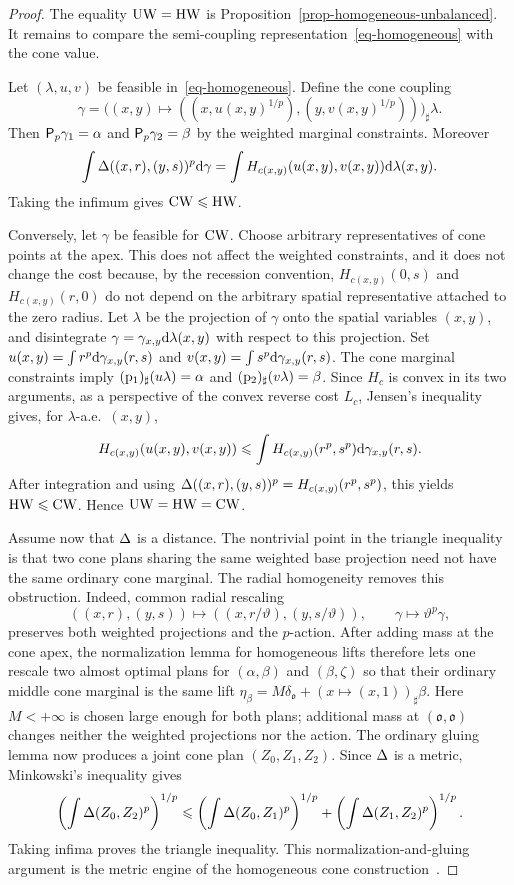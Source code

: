 \begin{proof}
	The equality $\operatorname{UW}=\operatorname{HW}$ is Proposition~\ref{prop-homogeneous-unbalanced}. It remains to compare the semi-coupling representation~\eqref{eq-homogeneous} with the cone value.

	Let $(\lambda,u,v)$ be feasible in~\eqref{eq-homogeneous}. Define the cone coupling
	\[
		\gamma
		=
		\big((x,y)\mapsto ((x,u(x,y)^{1/p}),(y,v(x,y)^{1/p}))\big)_\sharp\lambda.
	\]
	Then $\mathsf P_p\gamma_1=\alpha$ and $\mathsf P_p\gamma_2=\beta$ by the
	weighted marginal constraints. Moreover
	\[
		\int \Delta((x,r),(y,s))^p\mathrm{d}\gamma
		=
		\int H_{c(x,y)}(u(x,y),v(x,y))\mathrm{d}\lambda(x,y).
	\]
	Taking the infimum gives $\operatorname{CW}\leqslant\operatorname{HW}$.

	Conversely, let $\gamma$ be feasible for $\operatorname{CW}$. Choose arbitrary
	representatives of cone points at the apex. This does not affect the
	weighted constraints, and it does not change the cost because, by the
	recession convention, $H_{c(x,y)}(0,s)$ and $H_{c(x,y)}(r,0)$ do not depend
	on the arbitrary spatial representative attached to the zero radius. Let
	$\lambda$ be the projection of $\gamma$ onto the spatial variables
	$(x,y)$, and disintegrate
	$\gamma=\gamma_{x,y}\mathrm{d}\lambda(x,y)$ with respect to this projection. Set
	$u(x,y)=\int r^p\mathrm{d}\gamma_{x,y}(r,s)$ and $v(x,y)=\int s^p\mathrm{d}\gamma_{x,y}(r,s)$.
	The cone marginal constraints imply
	$(\mathrm{p}_1)_\sharp(u\lambda)=\alpha$ and
	$(\mathrm{p}_2)_\sharp(v\lambda)=\beta$. Since $H_c$ is convex in its two
	arguments, as a perspective of the convex reverse cost $L_c$, Jensen's
	inequality gives, for $\lambda$-a.e.\ $(x,y)$,
	\[
		H_{c(x,y)}(u(x,y),v(x,y))
		\leqslant
		\int H_{c(x,y)}(r^p,s^p)\mathrm{d}\gamma_{x,y}(r,s).
	\]
	After integration and using
	$\Delta((x,r),(y,s))^p=H_{c(x,y)}(r^p,s^p)$, this yields
	$\operatorname{HW}\leqslant\operatorname{CW}$. Hence $\operatorname{UW}=\operatorname{HW}=\operatorname{CW}$.

	Assume now that $\Delta$ is a distance. The nontrivial point in the triangle inequality is that two cone plans sharing the same weighted base projection need not have the same ordinary cone marginal. The radial homogeneity removes this obstruction. Indeed, common radial rescaling
	\[
		((x,r),(y,s))\mapsto((x,r/\vartheta),(y,s/\vartheta)),
		\qquad
		\gamma\mapsto\vartheta^p\gamma,
	\]
	preserves both weighted projections and the $p$-action. After adding mass at the cone apex, the normalization lemma for homogeneous lifts therefore lets one rescale two almost optimal plans for $(\alpha,\beta)$ and $(\beta,\zeta)$ so that their ordinary middle cone marginal is the same lift
	$\eta_\beta = M\delta_{\mathfrak o} + (x\mapsto(x,1))_\sharp\beta$.
	Here $M<+\infty$ is chosen large enough for both plans; additional mass at $(\mathfrak o,\mathfrak o)$ changes neither the weighted projections nor the action. The ordinary gluing lemma now produces a joint cone plan $(Z_0,Z_1,Z_2)$. Since $\Delta$ is a metric, Minkowski's inequality gives
	\[
		\left(\int\Delta(Z_0,Z_2)^p\right)^{1/p}
		\leqslant
		\left(\int\Delta(Z_0,Z_1)^p\right)^{1/p}
		+
		\left(\int\Delta(Z_1,Z_2)^p\right)^{1/p}.
	\]
	Taking infima proves the triangle inequality. This normalization-and-gluing argument is the metric engine of the homogeneous cone construction~\cite{LieroMielkeSavareLong}.


\end{proof}
